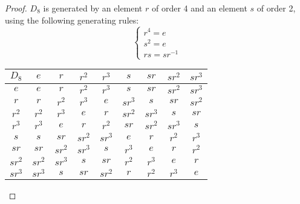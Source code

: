 \documentclass{article}
\begin{document}
\begin{enumerate}
\begin{enumerate}
\begin{proof}
          $D_8$ is generated by an element $r$ of order 4 and an element
          $s$ of order 2, using the following generating rules:
          \begin{equation} \label{eqn:D8}
            \begin{cases}
              r^4 = e \\
              s^2 = e \\
              rs = sr^{-1}
            \end{cases}
          \end{equation}
          \begin{center}
            \begin{tabular}{|c||c|c|c|c|c|c|c|c|}
              \hline
              $D_8$     & $e$   & $r$   & $r^2$   & $r^3$
                        & $s$   & $sr$  & $sr^2$  & $sr^3$ \\
              \hline\hline
              $e$       & $e$   & $r$   & $r^2$   & $r^3$
                        & $s$   & $sr$  & $sr^2$  & $sr^3$ \\
              \hline
              $r$       & $r$   & $r^2$ & $r^3$   & $e$
                        & $sr^3$& $s$   & $sr$    & $sr^2$ \\
              \hline
              $r^2$     & $r^2$ & $r^3$ & $e$     & $r$
                        & $sr^2$& $sr^3$& $s$     & $sr$ \\
              \hline
              $r^3$     & $r^3$ & $e$   & $r$     & $r^2$
                        & $sr$  & $sr^2$& $sr^3$  & $s$ \\
              \hline
              $s$       & $s$   & $sr$  & $sr^2$  & $sr^3$
                        & $e$   & $r$   & $r^2$   & $r^3$ \\
              \hline
              $sr$      & $sr$  & $sr^2$& $sr^3$  & $s$
                        & $r^3$ & $e$   & $r$     & $r^2$ \\
              \hline
              $sr^2$    & $sr^2$& $sr^3$& $s$     & $sr$
                        & $r^2$ & $r^3$ & $e$     & $r$ \\
              \hline
              $sr^3$    & $sr^3$& $s$   & $sr$    & $sr^2$
                        & $r$   & $r^2$ & $r^3$   & $e$ \\
              \hline
            \end{tabular}
          \end{center}


\end{proof}
\end{enumerate}
\end{enumerate}
\end{document}
